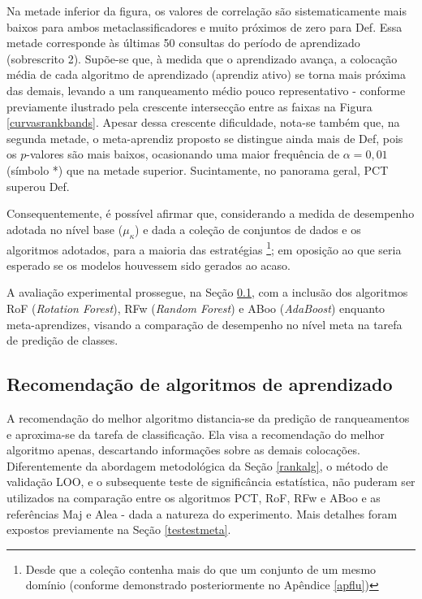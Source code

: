 Na metade inferior da figura, os valores de correlação são sistematicamente mais baixos para ambos metaclassificadores e muito próximos de zero para Def.
Essa metade corresponde às últimas 50 consultas do período de aprendizado (sobrescrito 2).
Supõe-se que, à medida que o aprendizado avança, a colocação média de cada algoritmo de aprendizado (aprendiz ativo) se torna mais próxima das demais, levando a um ranqueamento médio pouco representativo - conforme previamente ilustrado pela crescente intersecção entre as faixas na Figura \ref{curvasrankbands}.
Apesar dessa crescente dificuldade, nota-se também que, na segunda metade, o meta-aprendiz proposto se distingue ainda mais de Def, pois os $p$-valores são mais baixos, ocasionando uma maior frequência de $\alpha=0,01$ (símbolo *) que na metade superior.
Sucintamente, no panorama geral, PCT superou Def.

Consequentemente, é possível afirmar que, considerando a medida de desempenho adotada no nível base ($\mu_{\kappa}$) e dada a coleção de conjuntos de dados e os algoritmos adotados, para a maioria das estratégias \footnote{Desde que a coleção contenha mais do que um conjunto de um mesmo domínio (conforme demonstrado posteriormente no Apêndice \ref{apflu})}; em oposição ao que seria esperado se os modelos houvessem sido gerados ao acaso.

A avaliação experimental prossegue, na Seção \ref{recalg}, com a inclusão dos algoritmos RoF (\textit{Rotation Forest}), RFw (\textit{Random Forest}) e ABoo (\textit{AdaBoost}) enquanto meta-aprendizes, visando a comparação de desempenho no nível meta na tarefa de predição de classes.

\subsection{Recomendação de algoritmos de aprendizado}\label{recalg}
A recomendação do melhor algoritmo dis\-tan\-cia-se da predição de ranqueamentos e a\-pro\-xi\-ma-se da tarefa de classificação.
Ela visa a recomendação do melhor algoritmo apenas, descartando informações sobre as demais colocações.
Diferentemente da abordagem metodológica da Seção \ref {rankalg}, o método de validação LOO, e o subsequente teste de significância estatística, não puderam ser utilizados na comparação entre os algoritmos PCT, RoF, RFw e ABoo e as referências Maj e Alea - dada a natureza do experimento. Mais detalhes foram expostos previamente na Seção \ref{testestmeta}.

